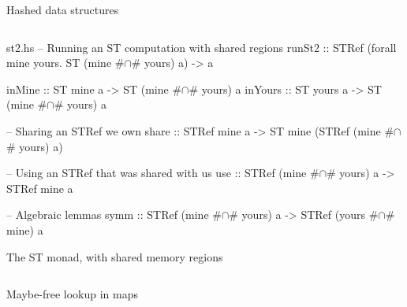 \documentclass{beamer}
\begin{document}
\begin{frame}{Hashed data structures}
\inputminted{haskell}{hashes.hs}
\end{frame}

\begin{filecontents*}{st2.hs}
-- Running an ST computation with shared regions
runSt2  ::
  STRef (forall mine yours. ST (mine #$\cap$# yours) a) -> a

inMine  :: ST mine  a -> ST (mine #$\cap$# yours) a
inYours :: ST yours a -> ST (mine #$\cap$# yours) a

-- Sharing an STRef we own
share  :: STRef mine a -> ST mine (STRef (mine #$\cap$# yours) a)

-- Using an STRef that was shared with us
use    :: STRef (mine #$\cap$# yours) a -> STRef mine a

-- Algebraic lemmas
symm   :: STRef (mine #$\cap$# yours) a -> STRef (yours #$\cap$# mine) a

\end{filecontents*}

\begin{frame}{}\end{frame}

\usebackgroundtemplate{}
\begin{frame}{The ST monad, with shared memory regions}
  \inputminted{haskell}{st2.hs}
\end{frame}

\begin{frame}{Maybe-free lookup in maps}
  \inputminted{haskell}{jmap.hs}
\end{frame}
\end{document}
